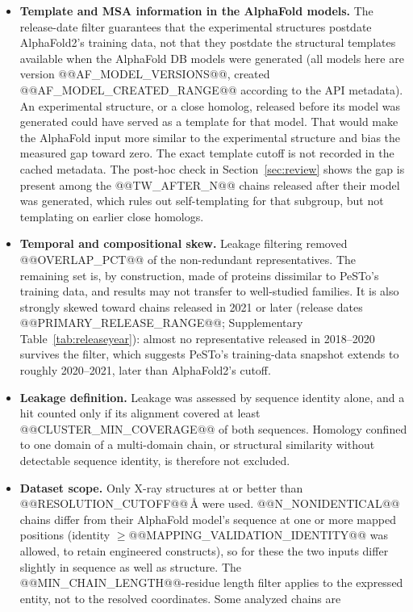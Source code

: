 \documentclass[10pt]{article}
\begin{document}
\begin{itemize}[nosep,leftmargin=1.4em]
\item \textbf{Template and MSA information in the AlphaFold models.} The
release-date filter guarantees that the experimental structures postdate
AlphaFold2's training data, not that they postdate the structural templates
available when the AlphaFold DB models were generated (all models here are
version @@AF_MODEL_VERSIONS@@, created @@AF_MODEL_CREATED_RANGE@@ according
to the API metadata). An experimental structure, or a close homolog,
released before its model was generated could have served as a template for
that model. That would make the AlphaFold input more similar to the
experimental structure and bias the measured gap toward zero. The exact
template cutoff is not recorded in the cached metadata. The post-hoc check
in Section~\ref{sec:review} shows the gap is present among the
@@TW_AFTER_N@@ chains released after their model was generated, which rules
out self-templating for that subgroup, but not templating on earlier close
homologs.
\item \textbf{Temporal and compositional skew.} Leakage filtering removed
@@OVERLAP_PCT@@ of the non-redundant representatives. The remaining set is,
by construction, made of proteins dissimilar to PeSTo's training data, and
results may not transfer to well-studied families. It is also strongly
skewed toward chains released in 2021 or later (release dates
@@PRIMARY_RELEASE_RANGE@@; Supplementary Table~\ref{tab:releaseyear}):
almost no representative released in 2018--2020 survives the filter, which
suggests PeSTo's training-data snapshot extends to roughly 2020--2021, later
than AlphaFold2's cutoff.
\item \textbf{Leakage definition.} Leakage was assessed by sequence identity
alone, and a hit counted only if its alignment covered at least
@@CLUSTER_MIN_COVERAGE@@ of both sequences. Homology confined to one domain
of a multi-domain chain, or structural similarity without detectable
sequence identity, is therefore not excluded.
\item \textbf{Dataset scope.} Only X-ray structures at or better than
@@RESOLUTION_CUTOFF@@\,\r{A} were used. @@N_NONIDENTICAL@@ chains differ from
their AlphaFold model's sequence at one or more mapped positions (identity
$\geq$@@MAPPING_VALIDATION_IDENTITY@@ was allowed, to retain engineered
constructs), so for these the two inputs differ slightly in sequence as well
as structure. The @@MIN_CHAIN_LENGTH@@-residue length filter applies to the
expressed entity, not to the resolved coordinates. Some analyzed chains are

\end{itemize}
\end{document}
